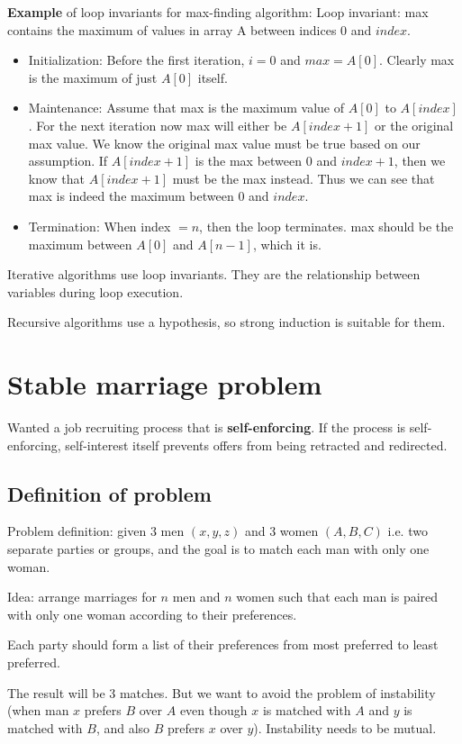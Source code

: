 \documentclass{article}
\begin{document}
\textbf{Example} of loop invariants for max-finding algorithm:
Loop invariant: max contains the maximum of values in array A between indices $0$ and $index$.

\begin{itemize}
    \item Initialization: Before the first iteration, $i = 0$ and $max = A[0]$. Clearly max is the maximum of just $A[0]$ itself.
    \item Maintenance: Assume that max is the maximum value of $A[0]$ to $A[index]$. For the next iteration now max will either be $A[index + 1]$ or the original max value. We know the original max value must be true based on our assumption. If $A[index + 1]$ is the max between $0$ and $index + 1$, then we know that $A[index + 1]$ must be the max instead. Thus we can see that max is indeed the maximum between $0$ and $index$.
    \item Termination: When index $= n$, then the loop terminates. max should be the maximum between $A[0]$ and $A[n - 1]$, which it is.
\end{itemize}

Iterative algorithms use loop invariants. They are the relationship between variables during loop execution.

Recursive algorithms use a hypothesis, so strong induction is suitable for them.

\section{Stable marriage problem}
Wanted a job recruiting process that is \textbf{self-enforcing}. If the process is self-enforcing, self-interest itself prevents offers from being retracted and redirected.

\subsection{Definition of problem}

Problem definition: given 3 men $(x, y, z)$ and 3 women $(A, B, C)$ i.e. two separate parties or groups, and the goal is to match each man with only one woman.

Idea: arrange marriages for $n$ men and $n$ women such that each man is paired with only one woman according to their preferences.

Each party should form a list of their preferences from most preferred to least preferred.

The result will be 3 matches. But we want to avoid the problem of instability (when man $x$ prefers $B$ over $A$ even though $x$ is matched with $A$ and $y$ is matched with $B$, and also $B$ prefers $x$ over $y$). Instability needs to be mutual.
\end{document}
